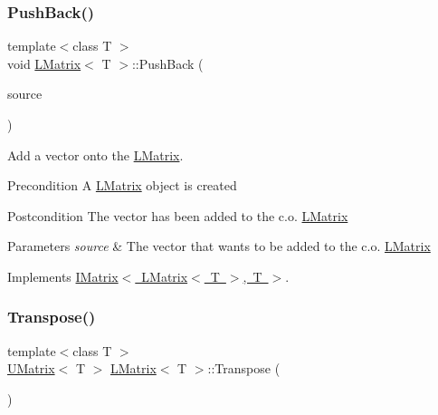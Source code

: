 \mbox{\label{class_l_matrix_a3f82539f6b2251d49a2e39c7c359b92d}} 
\subsubsection{\texorpdfstring{PushBack()}{PushBack()}}
{\footnotesize\ttfamily template$<$class T $>$ \\
void \mbox{\hyperlink{class_l_matrix}{L\+Matrix}}$<$ T $>$\+::Push\+Back (\begin{DoxyParamCaption}\item[{const \mbox{\hyperlink{class_my_vector}{My\+Vector}}$<$ T $>$ \&}]{source }\end{DoxyParamCaption})\hspace{0.3cm}{\ttfamily [virtual]}}



Add a vector onto the \mbox{\hyperlink{class_l_matrix}{L\+Matrix}}. 

\begin{DoxyPrecond}{Precondition}
A \mbox{\hyperlink{class_l_matrix}{L\+Matrix}} object is created 
\end{DoxyPrecond}
\begin{DoxyPostcond}{Postcondition}
The vector has been added to the c.\+o. \mbox{\hyperlink{class_l_matrix}{L\+Matrix}}
\end{DoxyPostcond}

\begin{DoxyParams}{Parameters}
{\em source} & The vector that wants to be added to the c.\+o. \mbox{\hyperlink{class_l_matrix}{L\+Matrix}} \\
\hline
\end{DoxyParams}


Implements \mbox{\hyperlink{class_i_matrix}{I\+Matrix$<$ L\+Matrix$<$ T $>$, T $>$}}.

\mbox{\label{class_l_matrix_afe89d1c0c91d284ff0277da586dc667a}} 
\subsubsection{\texorpdfstring{Transpose()}{Transpose()}}
{\footnotesize\ttfamily template$<$class T $>$ \\
\mbox{\hyperlink{class_u_matrix}{U\+Matrix}}$<$ T $>$ \mbox{\hyperlink{class_l_matrix}{L\+Matrix}}$<$ T $>$\+::Transpose (\begin{DoxyParamCaption}{ }\end{DoxyParamCaption})}



